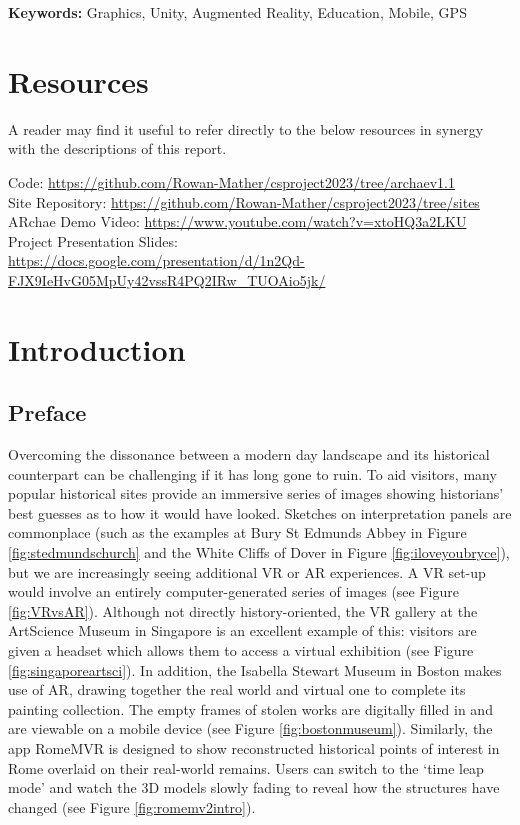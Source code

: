 \documentclass[12pt, a4paper]{article}
\begin{document}
\begin{center}
\textbf{Keywords:} Graphics, Unity, Augmented Reality, Education, Mobile, GPS
\end{center}

\newpage

\printglossary

\section*{Resources}
A reader may find it useful to refer directly to the below resources in synergy with the descriptions of this report.

Code: \url{https://github.com/Rowan-Mather/csproject2023/tree/archaev1.1} \cite{tools:repo} \\
Site Repository: \url{https://github.com/Rowan-Mather/csproject2023/tree/sites} \cite{tools:repo} \\
ARchae Demo Video: \url{https://www.youtube.com/watch?v=xtoHQ3a2LKU} \cite{design:videodemo} \\
Project Presentation Slides: \\
\url{https://docs.google.com/presentation/d/1n2Qd-FJX9IeHvG05MpUy42vssR4PQ2IRw_TUOAio5jk/}

\newpage

\tableofcontents

\newpage

\section{Introduction}

\subsection{Preface}
Overcoming the dissonance between a modern day landscape and its historical counterpart can be challenging if it has long gone to ruin. To aid visitors, many popular historical sites provide an immersive series of images showing historians' best guesses as to how it would have looked. Sketches on interpretation panels are commonplace (such as the examples at Bury St Edmunds Abbey in Figure \ref{fig:stedmundschurch} and the White Cliffs of Dover in Figure \ref{fig:iloveyoubryce}), but we are increasingly seeing additional \gls{VR} or \gls{AR} experiences. A VR set-up would involve an entirely computer-generated series of images (see Figure \ref{fig:VRvsAR}). Although not directly history-oriented, the VR gallery at the ArtScience Museum in Singapore is an excellent example of this: visitors are given a headset which allows them to access a virtual exhibition (see Figure \ref{fig:singaporeartsci}). In addition, the Isabella Stewart Museum in Boston makes use of AR, drawing together the real world and virtual one to complete its painting collection. The empty frames of stolen works are digitally filled in and are viewable on a mobile device (see Figure \ref{fig:bostonmuseum}). Similarly, the app RomeMVR is designed to show reconstructed historical points of interest in Rome overlaid on their real-world remains. Users can switch to the `time leap mode' and watch the 3D models slowly fading to reveal how the structures have changed (see Figure \ref{fig:romemv2intro}). 
\end{document}
